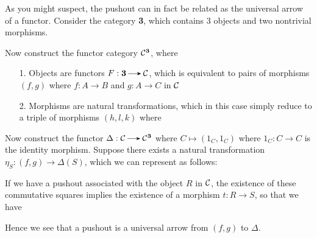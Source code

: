     As you might suspect, the pushout can in fact be related as the
    universal arrow of a functor. Consider the category \textbf{3},
    which contains 3 objects and two nontrivial morphisms. 
    \begin{center}
    \end{center}
    Now construct the functor category $\mathcal{C}^\textbf{3}$, where 
    \begin{itemize}
    \item[1.] Objects are functors $F: \textbf{3} \to \cc$, which is
    equivalent to pairs of morphisms $(f, g)$ where $f: A \to B$
    and $g: A \to C$ in $\mathcal{C}$ 

    \item[2.] Morphisms are natural transformations, which in this
    case simply reduce to a triple of morphisms $(h, l, k)$ where 
    \begin{center}
    \end{center}
    \end{itemize}
    Now construct the functor $\Delta: \cc \to \cc^\textbf{3}$ where
    $C \longmapsto (1_C, 1_C)$ where $1_C: C \to C$ is the identity
    morphism. Suppose there exists a natural transformation $\eta_S: (f,
    g) \to \Delta(S)$, which we can represent as follows:
    \begin{center}
    \end{center}
    If we have a pushout associated with the object $R$ in $\mathcal{C}$, the existence of these commutative squares implies the existence
    of a morphism $t: R \to S$, so that we have 
    \begin{center}
    \hspace{1cm}
    \end{center}
    Hence we see that a pushout is a universal arrow from $(f, g)$ to
    $\Delta$.